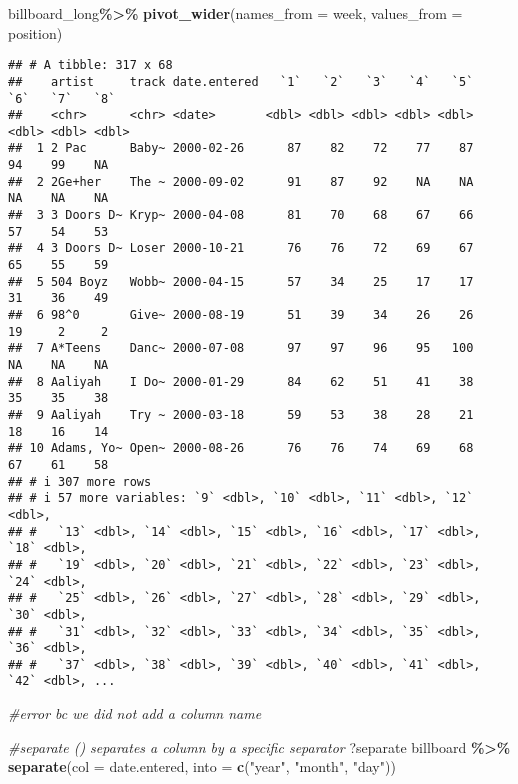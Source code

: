 \documentclass[
]{article}
\newenvironment{Shaded}{\begin{snugshade}}{\end{snugshade}}
\newcommand{\AttributeTok}[1]{\textcolor[rgb]{0.13,0.29,0.53}{#1}}
\newcommand{\CommentTok}[1]{\textcolor[rgb]{0.56,0.35,0.01}{\textit{#1}}}
\newcommand{\FunctionTok}[1]{\textcolor[rgb]{0.13,0.29,0.53}{\textbf{#1}}}
\newcommand{\NormalTok}[1]{#1}
\newcommand{\SpecialCharTok}[1]{\textcolor[rgb]{0.81,0.36,0.00}{\textbf{#1}}}
\newcommand{\StringTok}[1]{\textcolor[rgb]{0.31,0.60,0.02}{#1}}
\begin{document}
\begin{Shaded}
\begin{Highlighting}[]
\NormalTok{billboard\_long}\SpecialCharTok{\%\textgreater{}\%}
  \FunctionTok{pivot\_wider}\NormalTok{(}\AttributeTok{names\_from =}\NormalTok{ week,}
              \AttributeTok{values\_from =}\NormalTok{ position)}
\end{Highlighting}
\end{Shaded}

\begin{verbatim}
## # A tibble: 317 x 68
##    artist     track date.entered   `1`   `2`   `3`   `4`   `5`   `6`   `7`   `8`
##    <chr>      <chr> <date>       <dbl> <dbl> <dbl> <dbl> <dbl> <dbl> <dbl> <dbl>
##  1 2 Pac      Baby~ 2000-02-26      87    82    72    77    87    94    99    NA
##  2 2Ge+her    The ~ 2000-09-02      91    87    92    NA    NA    NA    NA    NA
##  3 3 Doors D~ Kryp~ 2000-04-08      81    70    68    67    66    57    54    53
##  4 3 Doors D~ Loser 2000-10-21      76    76    72    69    67    65    55    59
##  5 504 Boyz   Wobb~ 2000-04-15      57    34    25    17    17    31    36    49
##  6 98^0       Give~ 2000-08-19      51    39    34    26    26    19     2     2
##  7 A*Teens    Danc~ 2000-07-08      97    97    96    95   100    NA    NA    NA
##  8 Aaliyah    I Do~ 2000-01-29      84    62    51    41    38    35    35    38
##  9 Aaliyah    Try ~ 2000-03-18      59    53    38    28    21    18    16    14
## 10 Adams, Yo~ Open~ 2000-08-26      76    76    74    69    68    67    61    58
## # i 307 more rows
## # i 57 more variables: `9` <dbl>, `10` <dbl>, `11` <dbl>, `12` <dbl>,
## #   `13` <dbl>, `14` <dbl>, `15` <dbl>, `16` <dbl>, `17` <dbl>, `18` <dbl>,
## #   `19` <dbl>, `20` <dbl>, `21` <dbl>, `22` <dbl>, `23` <dbl>, `24` <dbl>,
## #   `25` <dbl>, `26` <dbl>, `27` <dbl>, `28` <dbl>, `29` <dbl>, `30` <dbl>,
## #   `31` <dbl>, `32` <dbl>, `33` <dbl>, `34` <dbl>, `35` <dbl>, `36` <dbl>,
## #   `37` <dbl>, `38` <dbl>, `39` <dbl>, `40` <dbl>, `41` <dbl>, `42` <dbl>, ...
\end{verbatim}

\begin{Shaded}
\begin{Highlighting}[]
\CommentTok{\#error bc we did not add a column name}
\end{Highlighting}
\end{Shaded}

\begin{Shaded}
\begin{Highlighting}[]
\CommentTok{\#separate () separates a column by a specific separator}
\NormalTok{?separate}
\NormalTok{billboard }\SpecialCharTok{\%\textgreater{}\%}
  \FunctionTok{separate}\NormalTok{(}\AttributeTok{col =}\NormalTok{ date.entered, }
           \AttributeTok{into =} \FunctionTok{c}\NormalTok{(}\StringTok{"year"}\NormalTok{, }\StringTok{"month"}\NormalTok{, }\StringTok{"day"}\NormalTok{))}
\end{Highlighting}
\end{Shaded}
\end{document}
